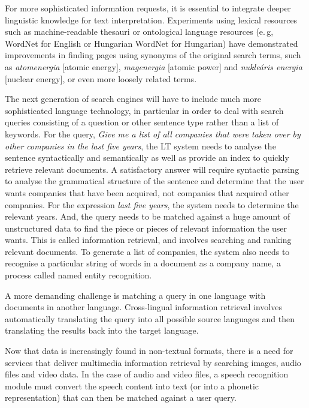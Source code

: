 \begin{multicols}{2}
  For more sophisticated information requests, it is essential to integrate deeper linguistic knowledge for text interpretation. Experiments using lexical resources such as machine-readable thesauri or ontological language resources (e.\,g, WordNet for English or Hungarian WordNet for Hungarian) have demonstrated improvements in finding pages using synonyms of the original search terms, such as \textit{atomenergia} [atomic energy], \textit{magenergia} [atomic power] and \textit{nukleáris energia} [nuclear energy], or even more loosely related terms.


  The next generation of search engines will have to include much more sophisticated language technology, in particular in order to deal with search queries consisting of a question or other sentence type rather than a list of keywords. For the query, \textit{Give me a list of all companies that were taken over by other companies in the last five years}, the LT system needs to analyse the sentence syntactically and semantically as well as provide an index to quickly retrieve relevant documents. A satisfactory answer will require syntactic parsing to analyse the grammatical structure of the sentence and determine that the user wants companies that have been acquired, not companies that acquired other companies. For the expression \textit{last five years}, the system needs to determine the relevant years. And, the query needs to be matched against a huge amount of unstructured data to find the piece or pieces of relevant information the user wants. This is called information retrieval, and involves searching and ranking relevant documents. To generate a list of companies, the system also needs to recognise a particular string of words in a document as a company name, a process called named entity recognition.

  A more demanding challenge is matching a query in one language with documents in another language. Cross-lingual information retrieval involves automatically translating the query into all possible source languages and then translating the results back into the target language. 

  Now that data is increasingly found in non-textual formats, there is a need for services that deliver multimedia information retrieval by searching images, audio files and video data. In the case of audio and video files, a speech recognition module must convert the speech content into text (or into a phonetic representation) that can then be matched against a user query.


\end{multicols}
